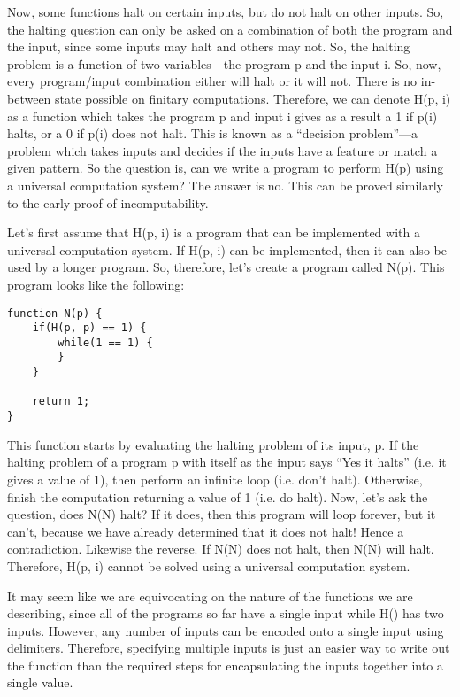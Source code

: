 Now, some functions halt on certain inputs, but do not halt on other inputs.  So, the halting question can only be asked on a combination of both the program and the input, since some inputs may halt and others may not.  So, the halting problem is a function of two variables---the program p and the input i.  So, now, every program/input combination either will halt or it will not.  There is no in-between state possible on finitary computations.  Therefore, we can denote H(p, i) as a function which takes the program p and input i gives as a result a 1 if p(i) halts, or a 0 if p(i) does not halt.  This is known as a ``decision problem''---a problem which takes inputs and decides if the inputs have a feature or match a given pattern.  So the question is, can we write a program to perform H(p) using a universal computation system?  The answer is no.  This can be proved similarly to the early proof of incomputability.  

Let's first assume that H(p, i) is a program that can be implemented with a universal computation system.  If H(p, i) can be implemented, then it can also be used by a longer program.  So, therefore, let's create a program called N(p).  This program looks like the following:

\begin{verbatim}
function N(p) {
	if(H(p, p) == 1) {
		while(1 == 1) {
		}
	}

	return 1;
}
\end{verbatim}

This function starts by evaluating the halting problem of its input, p.  If the halting problem of a program p with itself as the input says ``Yes it halts'' (i.e. it gives a value of 1), then perform an infinite loop (i.e. don't halt).  Otherwise, finish the computation returning a value of 1 (i.e. do halt).  Now, let's ask the question, does N(N) halt?  If it does, then this program will loop forever, but it can't, because we have already determined that it does not halt!  Hence a contradiction.  Likewise the reverse.  If N(N) does not halt, then N(N) will halt. Therefore, H(p, i) cannot be solved using a universal computation system.

It may seem like we are equivocating on the nature of the functions we are describing, since all of the programs so far have a single input while H() has two inputs.  However, any number of inputs can be encoded onto a single input using delimiters.  Therefore, specifying multiple inputs is just an easier way to write out the function than the required steps for encapsulating the inputs together into a single value.

